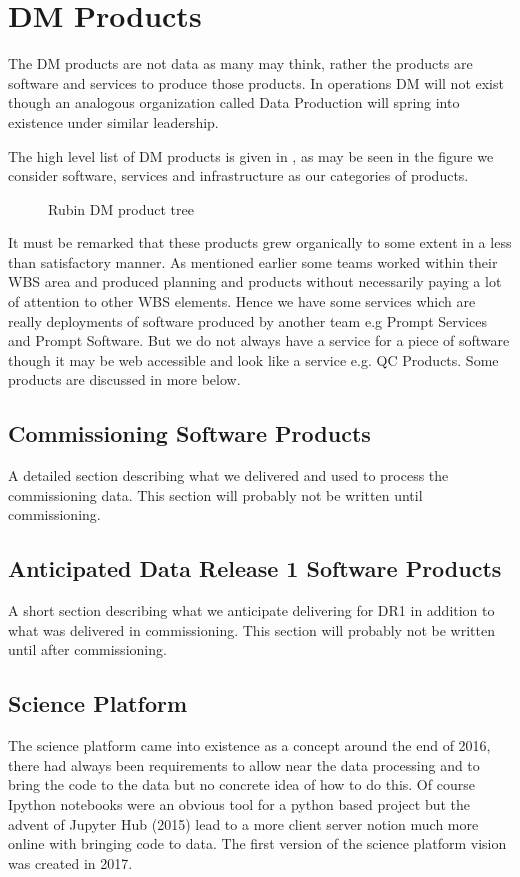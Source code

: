 \section {DM Products} \label{sec:softproducts}
The DM products are not data as many may think, rather the products are software and services to produce those
products.
In operations DM will not exist though an analogous organization called Data Production will spring into existence under similar leadership.

The high level list of DM products is given in , as may be seen in the  figure we consider software, services and infrastructure as our categories of products.


\begin{figure}
\caption{Rubin DM product tree \label{fig:pt}}
\end{figure}

It must be remarked that these products grew organically to some extent in a less than satisfactory manner.
As mentioned earlier some teams worked within their WBS area and produced planning and products without necessarily paying a lot of attention to other WBS elements. Hence we have some services which are really deployments of software produced by another team e.g Prompt Services and Prompt Software. But we do not always have a service for a piece of software though it may be web accessible and look like a service e.g. QC Products.
Some products are discussed in more below.


\subsection{Commissioning Software Products}
A detailed section describing what we delivered and used to process the commissioning data.
This section will probably not be written until  commissioning.

\subsection{Anticipated Data Release 1 Software Products}
A short section describing what we anticipate delivering  for DR1 in addition to what was delivered in commissioning.
This section will probably not be written until after commissioning.

\subsection{Science Platform}\label{sec:sciplat}
The science platform came into existence as a concept around the end of 2016, there had always been requirements to allow near the data processing and to  bring the code to the data but no concrete idea of how to do this. Of course Ipython notebooks were an obvious tool for a python based project but the advent of  Jupyter Hub  (2015) lead to a more client server notion much more online with bringing code to data. The first version of the science platform vision\cite{LSE-319} was created in 2017.

